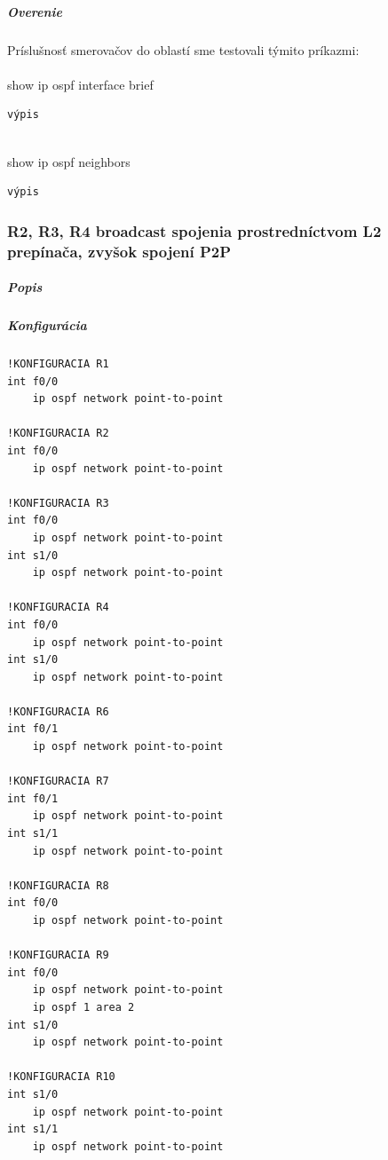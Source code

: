 \documentclass[12pt,twoside,a4paper]{article}
\begin{document}
\subparagraph{Overenie}
\subparagraph{}
Príslušnosť smerovačov do oblastí sme testovali týmito príkazmi:\\
\\
\noindent
show ip ospf interface brief

\noindent
{\selectfont
\begin{small}
\begin{verbatim}
výpis

\end{verbatim}
\end{small}
}

\noindent
\\
show ip ospf neighbors

\noindent
{\selectfont
\begin{small}
\begin{verbatim}
výpis

\end{verbatim}
\end{small}
}



\subsubsection*{R2, R3, R4 broadcast spojenia prostredníctvom L2 prepínača, zvyšok spojení P2P}
\subparagraph{Popis}
\subparagraph{}

\subparagraph{Konfigurácia}
\noindent
{\selectfont

\begin{small}

\begin{verbatim}
!KONFIGURACIA R1
int f0/0
    ip ospf network point-to-point

!KONFIGURACIA R2
int f0/0
    ip ospf network point-to-point

!KONFIGURACIA R3
int f0/0
    ip ospf network point-to-point
int s1/0
    ip ospf network point-to-point

!KONFIGURACIA R4
int f0/0
    ip ospf network point-to-point
int s1/0
    ip ospf network point-to-point

!KONFIGURACIA R6
int f0/1
    ip ospf network point-to-point

!KONFIGURACIA R7
int f0/1
    ip ospf network point-to-point
int s1/1
    ip ospf network point-to-point

!KONFIGURACIA R8
int f0/0
    ip ospf network point-to-point

!KONFIGURACIA R9
int f0/0
    ip ospf network point-to-point
    ip ospf 1 area 2
int s1/0
    ip ospf network point-to-point

!KONFIGURACIA R10
int s1/0
    ip ospf network point-to-point
int s1/1
    ip ospf network point-to-point
\end{verbatim}

\end{small}

}
\end{document}
